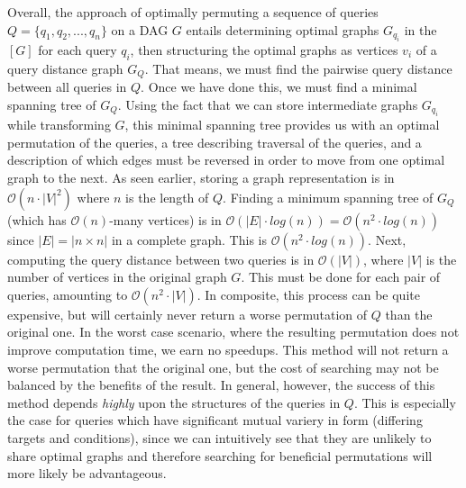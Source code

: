 \null \quad \quad Overall, the approach of optimally permuting a sequence of queries $Q = \{q_{1}, q_{2}, ..., q_{n}\}$ on a DAG $G$ entails determining optimal graphs $G_{q_{i}}$ in the $[G]$ for each query $q_{i}$, then structuring the optimal graphs as vertices $v_{i}$ of a query distance graph $G_{Q}$. That means, we must find the pairwise query distance between all queries in $Q$. Once we have done this, we must find a minimal spanning tree of $G_{Q}$. Using the fact that we can store intermediate graphs $G_{q_{i}}$ while transforming $G$, this minimal spanning tree provides us with an optimal permutation of the queries, a tree describing traversal of the queries, and a description of which edges must be reversed in order to move from one optimal graph to the next. \newline
\null \quad \quad As seen earlier, storing a graph representation is in $\mathcal{O}(n \cdot |V|^{2})$ where $n$ is the length of $Q$. Finding a minimum spanning tree of $G_{Q}$ (which has $\mathcal{O}(n)$-many vertices) is in $\mathcal{O}(|E|\cdot log(n)) = \mathcal{O}(n^{2} \cdot log(n))$ since $|E| = |n \times n|$ in a complete graph. This is $\mathcal{O}(n^{2}\cdot log(n))$. \newline
\null \quad \quad Next, computing the query distance between two queries is in $\mathcal{O}(|V|)$, where $|V|$ is the number of vertices in the original graph $G$. This must be done for each pair of queries, amounting to $\mathcal{O}(n^{2} \cdot |V|)$. In composite, this process can be quite expensive, but will certainly never return a worse permutation of $Q$ than the original one. \newline
\null \quad \quad In the worst case scenario, where the resulting permutation does not improve computation time, we earn no speedups. This method will not return a worse permutation that the original one, but the cost of searching may not be balanced by the benefits of the result. In general, however, the success of this method depends \textit{highly} upon the structures of the queries in $Q$. This is especially the case for queries which have significant  mutual variery in form (differing targets and conditions), since we can intuitively see that they are unlikely to share optimal graphs and therefore searching for beneficial permutations will more likely be advantageous. \newline









